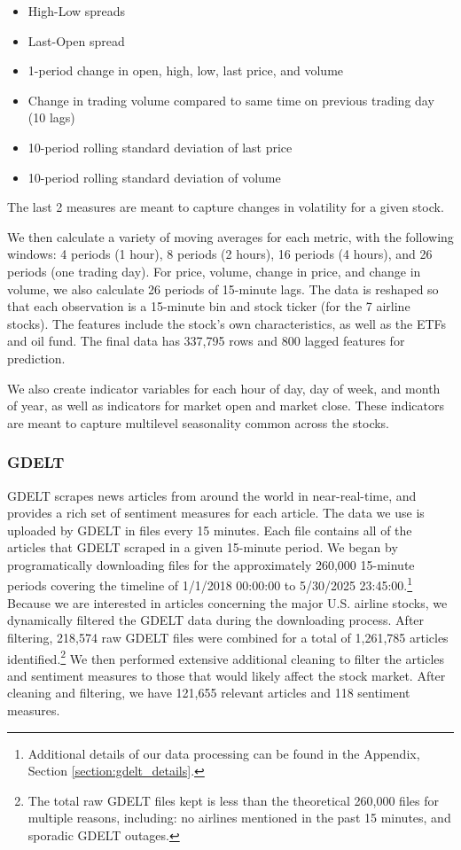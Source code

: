 \documentclass[12pt]{article}
\begin{document}
\begin{itemize}
\singlespacing
    \item High-Low spreads
    \item Last-Open spread
    \item 1-period change in open, high, low, last price, and volume
    \item Change in trading volume compared to same time on previous trading day (10 lags)
    \item 10-period rolling standard deviation of last price
    \item 10-period rolling standard deviation of volume
\end{itemize}
The last 2 measures are meant to capture changes in volatility for a given stock.

We then calculate a variety of moving averages for each metric, with the following windows: 4 periods (1 hour), 8 periods (2 hours), 16 periods (4 hours), and 26 periods (one trading day). For price, volume, change in price, and change in volume, we also calculate 26 periods of 15-minute lags. The data is reshaped so that each observation is a 15-minute bin and stock ticker (for the 7 airline stocks). The features include the stock's own characteristics, as well as the ETFs and oil fund. The final data has 337,795 rows and 800 lagged features for prediction.

We also create indicator variables for each hour of day, day of week, and month of year, as well as indicators for market open and market close. These indicators are meant to capture multilevel seasonality common across the stocks.

\subsubsection{GDELT}
GDELT scrapes news articles from around the world in near-real-time, and provides a rich set of sentiment measures for each article. The data we use is uploaded by GDELT in files every 15 minutes. Each file contains all of the articles that GDELT scraped in a given 15-minute period. We began by programatically downloading files for the approximately 260,000 15-minute periods covering the timeline of 1/1/2018 00:00:00 to 5/30/2025 23:45:00.\footnote{Additional details of our data processing can be found in the Appendix, Section \ref{section:gdelt_details}.} Because we are interested in articles concerning the major U.S. airline stocks, we dynamically filtered the GDELT data during the downloading process. After filtering, 218,574 raw GDELT files were combined for a total of 1,261,785 articles identified.\footnote{The total raw GDELT files kept is less than the theoretical 260,000 files for multiple reasons, including: no airlines mentioned in the past 15 minutes, and sporadic GDELT outages.} We then performed extensive additional cleaning to filter the articles and sentiment measures to those that would likely affect the stock market. After cleaning and filtering, we have 121,655 relevant articles and 118 sentiment measures.
\end{document}
